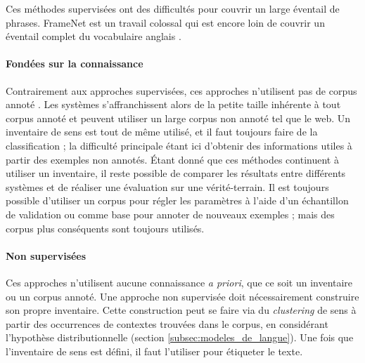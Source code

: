 Ces méthodes supervisées ont des difficultés pour couvrir un large éventail de
phrases. FrameNet est un travail colossal qui est encore loin de couvrir un
éventail complet du vocabulaire anglais \citep[p.~155]{marquez2008semantic}.





\paragraph{Fondées sur la connaissance}

Contrairement aux approches supervisées, ces approches n'utilisent pas de
corpus annoté \citep{swier2005exploiting,pradet2013revisiting}. Les systèmes
s'affranchissent alors de la petite taille inhérente à tout corpus annoté et
peuvent utiliser un large corpus non annoté tel que le web. Un inventaire de
sens est tout de même utilisé, et il faut toujours faire de la classification ;
la difficulté principale étant ici d'obtenir des informations utiles à partir
des exemples non annotés. Étant donné que ces méthodes continuent à utiliser un
inventaire, il reste possible de comparer les résultats entre différents
systèmes et de réaliser une évaluation sur une vérité-terrain. Il est toujours
possible d'utiliser un corpus pour régler les paramètres à l'aide d'un
échantillon de validation ou comme base pour annoter de nouveaux exemples ;
mais des corpus plus conséquents sont toujours utilisés.

\paragraph{Non supervisées}


Ces approches n'utilisent aucune connaissance \textit{a priori}, que ce soit un
inventaire ou un corpus annoté. Une approche non supervisée doit nécessairement
construire son propre inventaire. Cette construction peut se faire via du
\textit{clustering} de sens à partir des occurrences de contextes trouvées dans
le corpus, en considérant l'hypothèse distributionnelle (section
\ref{subsec:modeles_de_langue}). Une fois que l'inventaire de sens est défini, il
faut l'utiliser pour étiqueter le texte.

